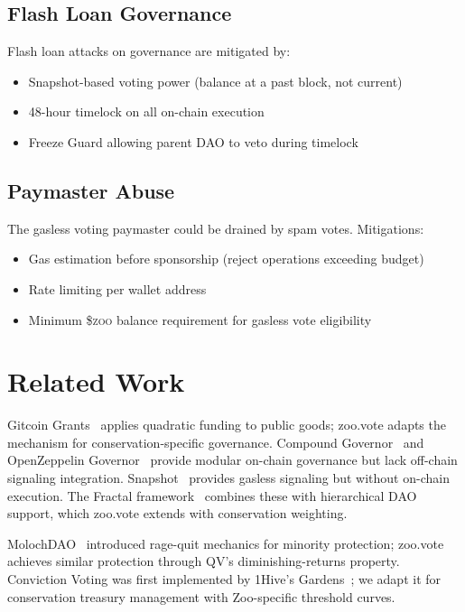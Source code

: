 \documentclass[11pt,letterpaper]{article}
\newcommand{\ZOO}{\$\textsc{zoo}}
\begin{document}
\subsection{Flash Loan Governance}

Flash loan attacks on governance are mitigated by:

\begin{itemize}
    \item Snapshot-based voting power (balance at a past block, not current)
    \item 48-hour timelock on all on-chain execution
    \item Freeze Guard allowing parent DAO to veto during timelock
\end{itemize}

\subsection{Paymaster Abuse}

The gasless voting paymaster could be drained by spam votes. Mitigations:

\begin{itemize}
    \item Gas estimation before sponsorship (reject operations exceeding budget)
    \item Rate limiting per wallet address
    \item Minimum \ZOO{} balance requirement for gasless vote eligibility
\end{itemize}

\section{Related Work}

Gitcoin Grants~\cite{gitcoin2019} applies quadratic funding to public goods; zoo.vote adapts the mechanism for conservation-specific governance. Compound Governor~\cite{compound2020} and OpenZeppelin Governor~\cite{oz2021governor} provide modular on-chain governance but lack off-chain signaling integration. Snapshot~\cite{snapshot2020} provides gasless signaling but without on-chain execution. The Fractal framework~\cite{fractal2023} combines these with hierarchical DAO support, which zoo.vote extends with conservation weighting.

MolochDAO~\cite{moloch2019} introduced rage-quit mechanics for minority protection; zoo.vote achieves similar protection through QV's diminishing-returns property. Conviction Voting was first implemented by 1Hive's Gardens~\cite{gardens2020}; we adapt it for conservation treasury management with Zoo-specific threshold curves.
\end{document}
